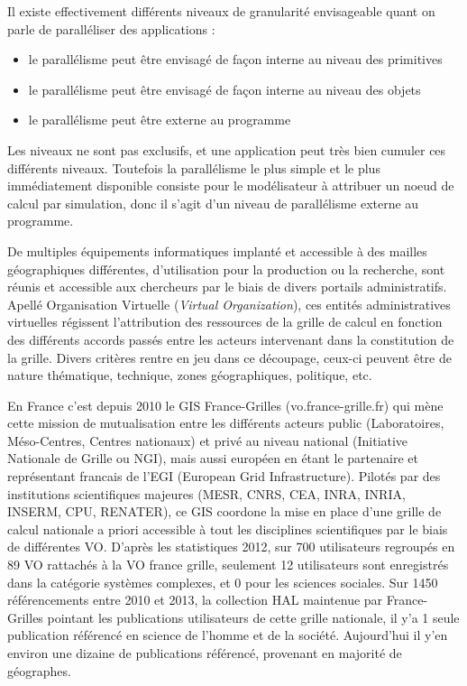 Il existe effectivement différents niveaux de granularité envisageable quant on parle de paralléliser des applications :
\begin{itemize}[label=\textbullet]
\item le parallélisme peut être envisagé de façon interne au niveau des primitives
\item le parallélisme peut être envisagé de façon interne au niveau des objets
\item le parallélisme peut être externe au programme
\end{itemize}

Les niveaux ne sont pas exclusifs, et une application peut très bien cumuler ces différents niveaux. Toutefois la parallélisme le plus simple et le plus immédiatement disponible consiste pour le modélisateur à attribuer un noeud de calcul par simulation, donc il s'agit d'un niveau de parallélisme externe au programme.

De multiples équipements informatiques implanté et accessible à des mailles géographiques différentes, d'utilisation pour la production ou la recherche, sont réunis et accessible aux chercheurs par le biais de divers portails administratifs. Apellé Organisation Virtuelle (\textit{Virtual Organization}), ces entités administratives virtuelles régissent l'attribution des ressources de la grille de calcul en fonction des différents accords passés entre les acteurs intervenant dans la constitution de la grille. Divers critères rentre en jeu dans ce découpage, ceux-ci peuvent être de nature thématique, technique, zones géographiques, politique, etc.

En France c'est depuis 2010 le GIS France-Grilles (vo.france-grille.fr) qui mène cette mission de mutualisation entre les différents acteurs public (Laboratoires, Méso-Centres, Centres nationaux) et privé au niveau national (Initiative Nationale de Grille ou NGI), mais aussi européen en étant le partenaire et représentant francais de l'EGI (European Grid Infrastructure). Pilotés par des institutions scientifiques majeures (MESR, CNRS, CEA, INRA, INRIA, INSERM, CPU, RENATER), ce GIS coordone la mise en place d'une grille de calcul nationale a priori accessible à tout les disciplines scientifiques par le biais de différentes VO. D'après les statistiques 2012, sur 700 utilisateurs regroupés en 89 VO rattachés à la VO france grille, seulement 12 utilisateurs sont enregistrés dans la catégorie systèmes complexes, et 0 pour les sciences sociales. Sur 1450 référencements entre 2010 et 2013, la collection HAL maintenue par France-Grilles pointant les publications utilisateurs de cette grille nationale, il y'a 1 seule publication référencé en science de l'homme et de la société. Aujourd'hui il y'en environ une dizaine de publications référencé, provenant en majorité de géographes.

